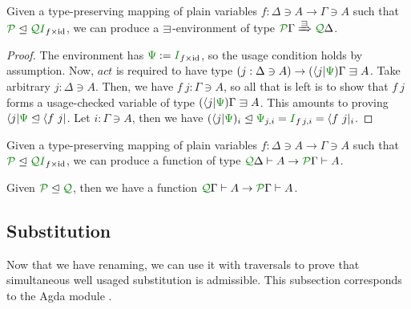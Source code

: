 \documentclass[submission,copyright,creativecommons]{eptcs}
\begin{document}
\begin{lemma}\label{lem:ren-env}
  Given a type-preserving mapping of plain variables
  $f : \Delta \ni A \to \Gamma \ni A$ such that
  $\resctx P \subres \resctx Q\rescomment I_{f\times\id}$,
  we can produce a $\lvar$-environment of type
  $\ctx{\Gamma}{P} \subst{\lvar} \ctx{\Delta}{Q}$.
\end{lemma}
\begin{proof}
  The environment has $\rescomment\Psi := \rescomment I_{f\times\id}$,
  so the usage condition holds by assumption.
  Now, $\mathit{act}$ is required to have type
  $(j : \Delta \ni A) \to (\langle j \rvert\rescomment\Psi)\Gamma \lvar A$.
  Take arbitrary $j : \Delta \ni A$.
  Then, we have $f~j : \Gamma \ni A$, so all that is left is to show that $f~j$
  forms a usage-checked variable of type
  $(\langle j \rvert\rescomment\Psi)\Gamma \lvar A$.
  This amounts to proving
  $\langle j \rvert\rescomment\Psi \subres \langle f~j \rvert$.
  Let $i : \Gamma \ni A$, then we have
    $(\langle j \rvert\rescomment\Psi)_i
    \subres \rescomment\Psi_{j,i}
    = \rescomment I_{f\,j,i}
    = \langle f~j \rvert_i$.
\end{proof}

\begin{corollary}\label{cor:ren}
  Given a type-preserving mapping of plain variables
  $f : \Delta \ni A \to \Gamma \ni A$ such that
  $\resctx P \subres \resctx Q\rescomment I_{f\times\id}$,
  we can produce a function of type
  $\ctx{\Delta}{Q} \vdash A \to \ctx{\Gamma}{P} \vdash A$.
\end{corollary}

\begin{corollary}\label{cor:subusage}
  Given $\resctx P \subres \resctx Q$, then we have a function
  $\ctx{\Gamma}{Q} \vdash A \to \ctx{\Gamma}{P} \vdash A$.
\end{corollary}

\subsection{Substitution}

Now that we have renaming, we can use it with traversals to prove that
simultaneous well usaged substitution is admissible. This subsection
corresponds to the Agda module
.
\end{document}
